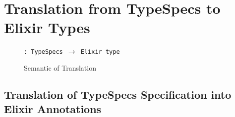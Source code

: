 \documentclass{article}
\begin{document}


\section{Translation from TypeSpecs to Elixir Types}

\begin{figure} [H]
   \begin{grammarfig}
      \dsb{\,\,} \texttt{: TypeSpecs $\rightarrow$ Elixir type}
   \end{grammarfig}
   \caption{Semantic of Translation}
   \label{app:semantic-of-translation}
\end{figure}


\subsection{Translation of TypeSpecs Specification into Elixir Annotations}









\end{document}
